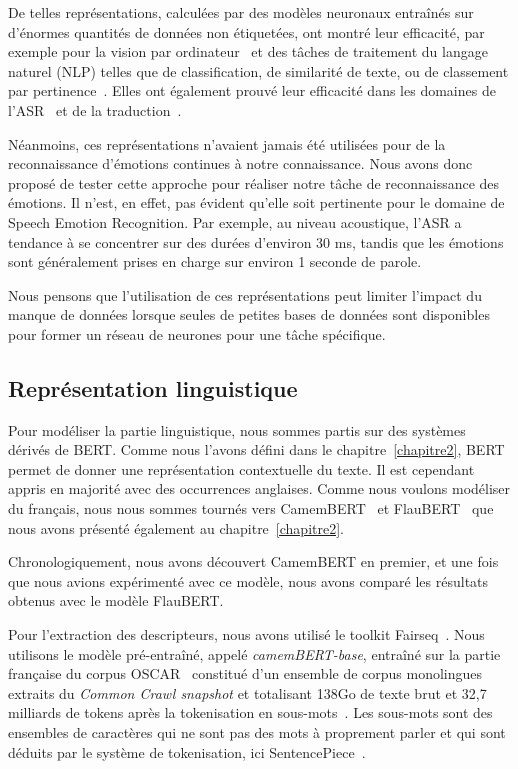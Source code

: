 De telles représentations, calculées par des modèles neuronaux entraînés sur d'énormes quantités de données non étiquetées, ont montré leur efficacité, par exemple pour la vision par ordinateur~\cite{Nanni2017} et des tâches de traitement du langage naturel (NLP) telles que de
classification, de similarité de texte, ou de classement par pertinence~\cite{Liu2019,Young2018,Yang2019}. Elles ont également prouvé leur efficacité dans les domaines de l'ASR~\cite{Kahn2020,Liu2020} et de la traduction~\cite{Nguyen2020}.

Néanmoins, ces représentations n'avaient jamais été utilisées pour de la reconnaissance d'émotions continues à notre connaissance. Nous avons donc proposé de tester cette approche pour réaliser notre tâche de reconnaissance des émotions. Il n'est, en effet, pas évident qu'elle soit pertinente pour le domaine de Speech Emotion Recognition. Par exemple, au niveau acoustique, l'ASR a tendance à se concentrer sur des durées d'environ 30 ms, tandis que les émotions sont généralement prises en charge sur environ 1 seconde de parole.

Nous pensons que l'utilisation de ces représentations peut limiter l'impact du manque de données lorsque seules de petites bases de données sont disponibles pour former un réseau de neurones pour une tâche spécifique.

\subsection{Représentation linguistique}
Pour modéliser la partie linguistique, nous sommes partis sur des systèmes dérivés de BERT. Comme nous l'avons défini dans le chapitre~\ref{chapitre2}, BERT permet de donner une représentation contextuelle du texte. Il est cependant appris en majorité avec des occurrences anglaises. Comme nous voulons modéliser du français, nous nous sommes tournés vers CamemBERT~\cite{Martin2020} et FlauBERT~\cite{Le2020} que nous avons présenté également au chapitre~\ref{chapitre2}.

Chronologiquement, nous avons découvert CamemBERT en premier, et une fois que nous avions expérimenté avec ce modèle, nous avons comparé les résultats obtenus avec le modèle FlauBERT.

Pour l'extraction des descripteurs, nous avons utilisé le toolkit Fairseq~\cite{Ott2019}. Nous utilisons le modèle pré-entraîné, appelé \textit{camemBERT-base}, entraîné sur la partie française du corpus OSCAR~\cite{Ortizsuarez2019} constitué d'un ensemble de corpus monolingues extraits du \textit{Common Crawl snapshot} et totalisant 138Go de texte brut et 32,7 milliards de tokens après la tokenisation en sous-mots~\cite{Wu2016}. Les sous-mots sont des ensembles de caractères qui ne sont pas des mots à proprement parler et qui sont déduits par le système de tokenisation, ici SentencePiece~\cite{Kudo2018}.

